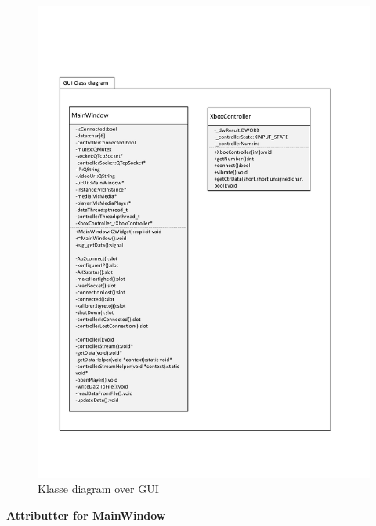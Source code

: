 \begin{figure}[H]
\centering
\includegraphics[width=\textwidth* 9/10]{../fig/diagrammer/pc/gui_classdiagram.pdf}
\caption{Klasse diagram over GUI}
\label{fig:cd_gui}
\end{figure}

\textbf{Attributter for MainWindow}

